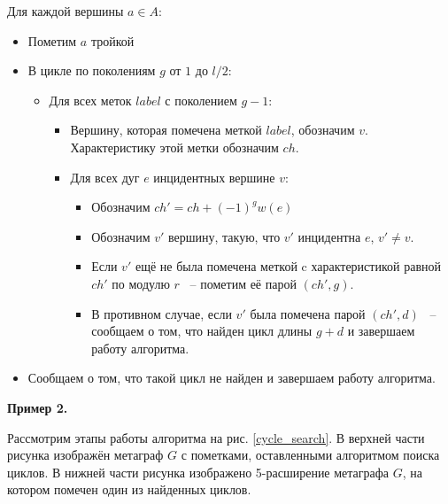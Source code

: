 \documentclass[14pt]{mmcs-article}
\begin{document}
Для каждой вершины $a \in A:$

\begin{itemize}
    \item Пометим $a$ тройкой 
    \item В цикле по поколениям $g$ от $1$ до $l / 2$:
      \begin{itemize}
      \item Для всех меток $label$ с поколением $g - 1$:
        \begin{itemize}
        \item Вершину, которая помечена меткой $label$, обозначим $v$.\\ Характеристику этой метки обозначим $ch$.
        \item Для всех дуг $e$ инцидентных вершине $v$:
          \begin{itemize}
          \item Обозначим $ch' = ch + (-1)^{g} w(e)$
          \item Обозначим $v'$ вершину, такую, что $v'$ инцидентна $e$, $v' \neq v$.
          \item Если $v'$ ещё не была помечена меткой c характеристикой равной $ch'$ по модулю $r$ ~-- пометим её парой $(ch', g)$.
          \item В противном случае, если $v'$ была помечена парой $(ch', d)$ ~-- сообщаем о том, что найден цикл длины $g + d$ и завершаем работу алгоритма.
          \end{itemize}
        \end{itemize}
      \end{itemize}
    \item Сообщаем о том, что такой цикл не найден и завершаем работу алгоритма.
\end{itemize}

\textbf{Пример 2.}


Рассмотрим этапы работы алгоритма на рис. \ref{cycle_search}. В верхней части рисунка изображён метаграф $G$ с пометками, оставленными алгоритмом поиска циклов. В нижней части рисунка изображено 5-расширение метаграфа $G$, на котором помечен один из найденных циклов.
\end{document}
